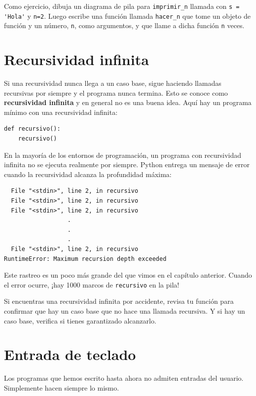 \documentclass[10pt]{book}
\begin{document}
Como ejercicio, dibuja un diagrama de pila para \verb"imprimir_n" llamada con
\verb"s = 'Hola'" y {\tt n=2}.
Luego escribe una función llamada \verb"hacer_n" que tome un objeto de
función y un número, {\tt n}, como argumentos, y que llame
a dicha función {\tt n} veces.


\section{Recursividad infinita}

Si una recursividad nunca llega a un caso base, sigue haciendo
llamadas recursivas por siempre y el programa nunca termina.  Esto se
conoce como {\bf recursividad infinita} y en general no es
una buena idea.  Aquí hay un programa mínimo con una recursividad infinita:

\begin{verbatim}
def recursivo():
    recursivo()
\end{verbatim}
%
En la mayoría de los entornos de programación, un programa con recursividad infinita
no se ejecuta realmente por siempre.  Python entrega un
mensaje de error cuando la recursividad alcanza la profundidad máxima:

\begin{verbatim}
  File "<stdin>", line 2, in recursivo
  File "<stdin>", line 2, in recursivo
  File "<stdin>", line 2, in recursivo
                  .
                  .
                  .
  File "<stdin>", line 2, in recursivo
RuntimeError: Maximum recursion depth exceeded
\end{verbatim}
%
Este rastreo es un poco más grande del que vimos en el
capítulo anterior.  Cuando el error ocurre, ¡hay 1000
marcos de {\tt recursivo} en la pila!

Si encuentras una recursividad infinita por accidente, revisa
tu función para confirmar que hay un caso base que no
hace una llamada recursiva.  Y si hay un caso base, verifica si
tienes garantizado alcanzarlo.


\section{Entrada de teclado}

Los programas que hemos escrito hasta ahora no admiten entradas del usuario.
Simplemente hacen siempre lo mismo.
\end{document}
